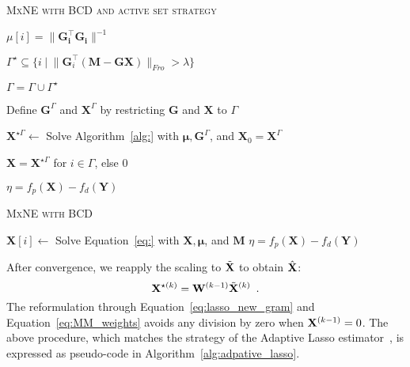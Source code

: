 {\fontsize{4}{4}\selectfont
\begin{algorithm}[t]
\caption{\textsc{MxNE with BCD and active set strategy}}
    {
		$\mu[i] = \|\mathbf{G^\top_i\mathbf{G}_i}\|^{-1}$
     }
\While{
		$\eta \geq \epsilon$
	  }
	  {
	  	$\Gamma^\star\subseteq \{i \hspace{3pt} | \hspace{3pt} \|\mathbf{G}_i^\top(\mathbf{M}-\mathbf{GX})\|_{Fro} > \lambda\}$

	  	$\Gamma = \Gamma\cup \Gamma^\star$

	  	Define $\mathbf{G}^\Gamma$ and $\mathbf{X}^\Gamma$ by restricting $\mathbf{G}$ and $\mathbf{X}$ to $\Gamma$

	  	$\mathbf{X}^{\star\Gamma}\leftarrow$ Solve Algorithm~\ref{alg:} with $\mathbf{\mu}, \mathbf{G}^\Gamma$, and $\mathbf{X}_0=\mathbf{X}^\Gamma$

	  	$\mathbf{X}=\mathbf{X}^{\star\Gamma}$ for $i\in\Gamma$, else 0

	  	$\eta=f_p(\mathbf{X})-f_d(\mathbf{Y})$
	  }
\label{alg:mxne_activeset}
\end{algorithm}
}

{\fontsize{4}{4}\selectfont
\begin{algorithm}[t]
\caption{\textsc{MxNE with BCD}}
\While{
		$\eta \geq \epsilon$
	  }
	  {
	  		{
	  			$\mathbf{X}[i]\leftarrow$ Solve Equation~\eqref{eq:} with $\mathbf{X}, \mathbf{\mu}$, and $\mathbf{M}$
	  		}
	  	$\eta = f_p(\mathbf{X})-f_d(\mathbf{Y})$
	  }
\label{alg:mxne_bcd}
\end{algorithm}
}

After convergence, we reapply the scaling to $\tilde{\mathbf{X}}$ to obtain $\hat{\mathbf{X}}$:
\begin{equation}
    \label{eq:MM_weights}
    \mathbf{X}^{\star(k)} = \mathbf{W}^{(k-1)} \tilde{\mathbf{X}}^{(k)} \enspace .
\end{equation}
The reformulation through Equation~\eqref{eq:lasso_new_gram} and Equation~\ref{eq:MM_weights} avoids any division by zero when $\mathbf{X}^{(k-1)}=0$. The above procedure, which matches the strategy of the Adaptive Lasso estimator~\cite{Zou06}, is expressed as pseudo-code in Algorithm~\ref{alg:adpative_lasso}.

